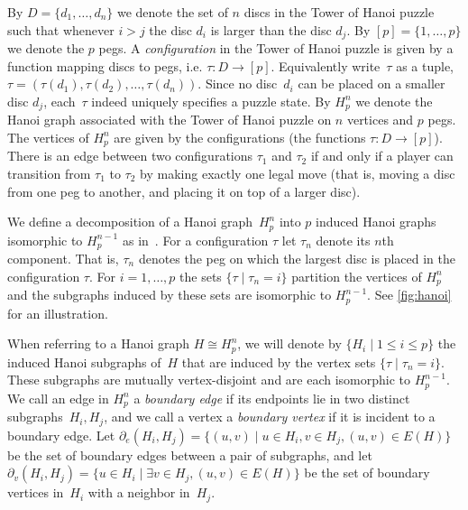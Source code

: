 \documentclass[
final
]{dmtcs-episciences}
\newcommand{\edgeh}[2]{\partial_e(#1,#2)}
\newcommand{\bdryh}[2]{\partial_v(#1,#2)}
\begin{document}
By $D = \{d_1, \dots, d_n\}$ we denote the set of $n$ discs in the Tower of Hanoi puzzle such that whenever $i > j$ the disc $d_i$ is larger than the disc $d_j$. By $[p] = \{1, \dots, p\}$ we denote the $p$ pegs. A \emph{configuration} in the Tower of Hanoi puzzle is given by a function mapping discs to pegs, i.e. $\tau \colon D \rightarrow [p]$. Equivalently write~$\tau$ as a tuple, $\tau = (\tau(d_1), \tau(d_2), \dots, \tau(d_n))$. Since no disc~$d_i$ can be placed on a smaller disc $d_j$, each~$\tau$ indeed uniquely specifies a puzzle state. By $H_p^n$ we denote the Hanoi graph associated with the Tower of Hanoi puzzle on $n$ vertices and $p$ pegs. The vertices of $H_p^n$ are given by the configurations (the functions $\tau \colon D \rightarrow [p]$). There is an edge between two configurations $\tau_1$ and $\tau_2$ if and only if a player can transition from $\tau_1$ to $\tau_2$ by making exactly one legal move (that is, moving a disc from one peg to another, and placing it on top of a larger disc).

We define a decomposition of a Hanoi graph~$H_p^n$ into $p$ induced Hanoi graphs isomorphic to $H_p^{n-1}$ as in~\cite{hanoitw}. For a configuration $\tau$ let $\tau_n$ denote its $n$th component. That is, $\tau_n$ denotes the peg on which the largest disc is placed in the configuration $\tau$. For $i=1,\dots,p$ the sets $\{ \tau \mid \tau_n = i \}$ partition the vertices of $H_p^n$ and the subgraphs induced by these sets are isomorphic to $H_p^{n-1}$. See \cref{fig:hanoi} for an illustration.

When referring to a Hanoi graph $H \cong H_p^n$, we will denote by $\{H_i\mid 1 \leq i \leq p\}$ the induced Hanoi subgraphs of~$H$ that are  induced by the vertex sets $\{\tau \mid \tau_n = i\}$. These subgraphs are mutually vertex-disjoint and are each isomorphic to $H_p^{n-1}$. We call an edge in $H^n_p$ a \emph{boundary edge} if its endpoints lie in two distinct subgraphs~$H_i,H_j$, and we call a vertex a \emph{boundary vertex} if it is incident to a boundary edge. Let $\edgeh{H_i}{H_j} = \{(u, v) \mid u \in H_i, v \in H_j, (u, v) \in E(H)\}$ be the set of boundary edges between a pair of subgraphs, and let $\bdryh{H_i}{H_j} = \{u \in H_i \mid \exists v \in H_j, (u, v) \in E(H)\}$ be the set of boundary vertices in~$H_i$ with a neighbor in~$H_j$.
\end{document}
